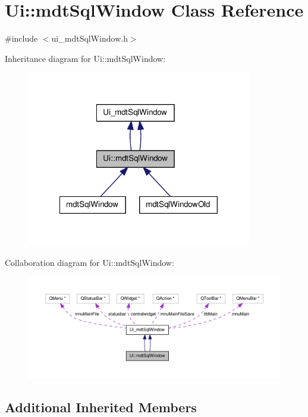 \hypertarget{class_ui_1_1mdt_sql_window}{\section{Ui\-:\-:mdt\-Sql\-Window Class Reference}
\label{class_ui_1_1mdt_sql_window}
}


{\ttfamily \#include $<$ui\-\_\-mdt\-Sql\-Window.\-h$>$}



Inheritance diagram for Ui\-:\-:mdt\-Sql\-Window\-:\nopagebreak
\begin{figure}[H]
\begin{center}
\leavevmode
\includegraphics[width=278pt]{class_ui_1_1mdt_sql_window__inherit__graph}
\end{center}
\end{figure}


Collaboration diagram for Ui\-:\-:mdt\-Sql\-Window\-:\nopagebreak
\begin{figure}[H]
\begin{center}
\leavevmode
\includegraphics[width=350pt]{class_ui_1_1mdt_sql_window__coll__graph}
\end{center}
\end{figure}
\subsection*{Additional Inherited Members}


